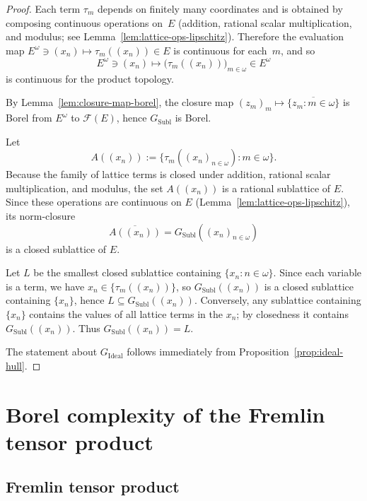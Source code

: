 \documentclass[12pt]{amsart}
\theoremstyle{plain}
\theoremstyle{definition}
\theoremstyle{remark}
\DeclareMathOperator{\Subl}{Subl}
\DeclareMathOperator{\Ideal}{Ideal}
\begin{document}
\begin{proof}
Each term $\tau_m$ depends on finitely many coordinates and is obtained by
composing continuous operations on~$E$ (addition, rational scalar
multiplication, and modulus; see Lemma~\ref{lem:lattice-ops-lipschitz}).
Therefore the evaluation map
$E^\omega \ni (x_n) \mapsto \tau_m((x_n)) \in E$ is continuous for each~$m$,
and so
\[
    E^\omega \ni (x_n) \longmapsto
    \bigl(\tau_m((x_n))\bigr)_{m \in \omega} \in E^\omega
\]
is continuous for the product topology.

By Lemma~\ref{lem:closure-map-borel}, the closure map
$(z_m)_m \mapsto \overline{\{z_m \colon m \in \omega\}}$ is Borel from
$E^\omega$ to $\mathcal{F}(E)$, hence $G_{\Subl}$ is Borel.

Let
\[
    A((x_n)) := \{\tau_m((x_n)_{n \in \omega}) \colon m \in \omega\}.
\]
Because the family of lattice terms is closed under addition, rational scalar
multiplication, and modulus, the set $A((x_n))$ is a rational sublattice of $E$.
Since these operations are continuous on $E$
(Lemma~\ref{lem:lattice-ops-lipschitz}),
its norm-closure
\[
    \overline{A((x_n))}
    = G_{\Subl}((x_n)_{n \in \omega})
\]
is a closed sublattice of $E$.

Let $L$ be the smallest closed sublattice containing
$\{x_n \colon n \in \omega\}$.  Since each variable is a term, we have
$x_n \in \{\tau_m((x_n))\}$, so $G_{\Subl}((x_n))$ is a closed sublattice
containing $\{x_n\}$, hence $L \subseteq G_{\Subl}((x_n))$.  Conversely, any
sublattice containing $\{x_n\}$ contains the values of all lattice terms in the
$x_n$; by closedness it contains $G_{\Subl}((x_n))$.  Thus
$G_{\Subl}((x_n)) = L$.

The statement about $G_{\Ideal}$ follows immediately from
Proposition~\ref{prop:ideal-hull}.
\end{proof}

\section{Borel complexity of the Fremlin tensor product}\label{sec:tensor}

\subsection{Fremlin tensor product}
\end{document}
